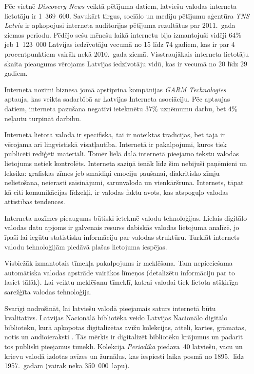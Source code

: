 \begin{multicols}{2}
Pēc vietnē \textit{Discovery News} veiktā pētījuma datiem, latviešu valodas interneta lietotāju ir 1~369~600.
Savukārt tirgus, sociālo un mediju pētījumu aģentūra \textit{TNS Latvia} ir apkopojusi interneta auditorijas pētījuma rezultātus par 2011.~gada ziemas periodu.
Pēdējo sešu mēnešu laikā internetu bija izmantojuši vidēji 64\%  jeb 1~123~000 Latvijas iedzīvotāju vecumā no 15 līdz 74 gadiem, kas ir par 4 procentpunktiem vairāk nekā 2010.~gada ziemā. 
Visstraujākais interneta lietotāju skaita pieaugums vērojams Latvijas iedzīvotāju vidū, kas ir vecumā no 20 līdz 29 gadiem.

Interneta nozīmi biznesa jomā apstiprina kompānijas \textit{GARM Technologies} aptauja, kas veikta sadarbībā ar Latvijas Interneta asociāciju. 
Pēc aptaujas datiem, interneta pazušana negatīvi ietekmētu 37\% uzņēmumu darbu, bet 4\% neļautu turpināt darbību.

Internetā lietotā valoda ir specifiska, tai ir noteiktas tradīcijas, bet tajā ir vērojama arī lingvistiskā visatļautība. 
Internetā ir pakalpojumi, kuros tiek publicēti rediģēti materiāli. 
Tomēr lielā daļā internetā pieejamo tekstu valodas lietojums netiek kontrolēts. 
Interneta saziņā ienāk līdz šim nebijuši paņēmieni un leksika: grafiskas zīmes jeb smaidiņi emociju pau\-šanai, diakritisko zīmju \mbox{nelietošana}, neierasti saīsinājumi, sarunvaloda un vienkāršruna. 
Internets, tāpat kā citi komunikācijas līdzekļi, ir valodas faktu avots, kas atspoguļo valodas attīstības tendences.

Interneta nozīmes pieaugums būtiski ietekmē valodu tehnoloģijas. 
Lielais digitālo valodas datu apjoms ir galvenais resurss dabiskās valodas lietojuma analīzē, jo īpaši lai iegūtu statistisku informāciju par valodas struktūru.
Turklāt internets valodu tehnoloģijām piedāvā plašas lietojuma iespējas. 

Visbiežāk izmantotais tīmekļa pakalpojums ir meklēšana.
Tam nepieciešama automātiska valodas apstrāde vairākos līmeņos (detalizētu informāciju par to lasiet tālāk).
Lai veiktu meklēšanu tīmeklī, katrai valodai tiek lietota atšķirīga sarežģīta valodas tehnoloģija.

Svarīgi nodrošināt, lai latviešu valodā pieejamais saturs internetā būtu kvalitatīvs.
Latvijas Nacionālā bibliotēka veido Latvijas Nacionālo digitālo bibliotēku, kurā apkopotas digitalizētas avīžu kolekcijas, attēli, kartes, grāmatas, notis un audioieraksti \cite{Meta6}.
Tās mērķis ir digitalizēt bibliotēku krājumus un padarīt tos publiski pieejamus tīmeklī.
Kolekcija \textit{Periodika} piedāvā~40 latviešu, vācu un krievu valodā izdotas avīzes un žurnālus, kas iespiesti laika posmā no 1895.~līdz 1957.~gadam (vairāk nekā 350~000~lapu).


\end{multicols}
